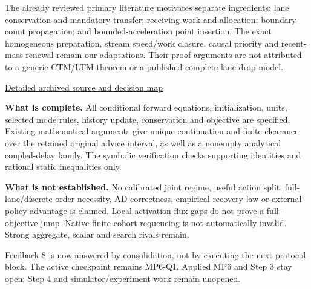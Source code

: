 The already reviewed primary literature motivates separate ingredients:
lane conservation and mandatory transfer; receiving-work and allocation;
boundary-count propagation; and bounded-acceleration point insertion.
The exact homogeneous preparation, stream speed/work closure, causal
priority and recent-mass renewal remain our adaptations. Their proof
arguments are not attributed to a generic CTM/LTM theorem or a published
complete lane-drop model.

\begin{center}
\href{../../extraction/research_readiness/vsl_feedback8_model_stack_source_map.md}{Detailed archived source and decision map}
\end{center}

\textbf{What is complete.} All conditional forward equations, initialization,
units, selected mode rules, history update, conservation and objective are
specified. Existing mathematical arguments give unique continuation and
finite clearance over the retained original advice interval, as well as
a nonempty analytical coupled-delay family. The symbolic verification
checks supporting identities and rational static inequalities only.

\textbf{What is not established.} No calibrated joint regime, useful action
split, full-lane/discrete-order necessity, AD correctness, empirical recovery
law or external policy advantage is claimed. Local activation-flux gaps
do not prove a full-objective jump. Native finite-cohort requeueing is not
automatically invalid. Strong aggregate, scalar and search rivals remain.

Feedback 8 is now answered by consolidation, not by executing the next
protocol block. The active checkpoint remains MP6-Q1. Applied MP6 and
Step 3 stay open; Step 4 and simulator/experiment work remain unopened.

